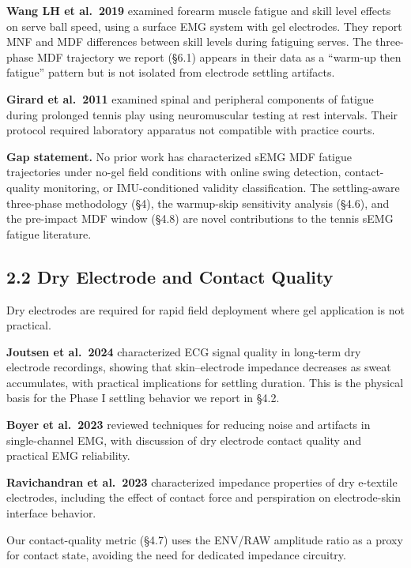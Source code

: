 \documentclass[sensors,article,submit,pdftex,moreauthors]{Definitions/mdpi}
\begin{document}
\textbf{Wang LH et al.~2019} \citep{wanglh2019} examined forearm muscle fatigue and skill level effects on serve
ball speed, using a surface EMG system with gel electrodes. They report MNF and MDF
differences between skill levels during fatiguing serves. The three-phase MDF trajectory we
report (§6.1) appears in their data as a ``warm-up then fatigue'' pattern but is not isolated
from electrode settling artifacts.

\textbf{Girard et al.~2011} \citep{girard2011} examined spinal and peripheral components of fatigue during
prolonged tennis play using neuromuscular testing at rest intervals. Their protocol required
laboratory apparatus not compatible with practice courts.

\textbf{Gap statement.} No prior work has characterized sEMG MDF fatigue trajectories under
no-gel field conditions with online swing detection, contact-quality monitoring, or
IMU-conditioned validity classification. The settling-aware three-phase methodology (§4),
the warmup-skip sensitivity analysis (§4.6), and the pre-impact MDF window (§4.8) are
novel contributions to the tennis sEMG fatigue literature.

\subsection{2.2 Dry Electrode and Contact Quality}\label{dry-electrode-and-contact-quality}

Dry electrodes are required for rapid field deployment where gel application is not practical.

\textbf{Joutsen et al.~2024} \citep{joutsen2024} characterized ECG signal quality in long-term dry electrode
recordings, showing that skin--electrode impedance decreases as sweat accumulates, with
practical implications for settling duration. This is the physical basis for the Phase I
settling behavior we report in §4.2.

\textbf{Boyer et al.~2023} \citep{boyer2023} reviewed techniques for reducing noise and artifacts in single-channel
EMG, with discussion of dry electrode contact quality and practical EMG reliability.

\textbf{Ravichandran et al.~2023} \citep{ravichandran2023} characterized impedance properties of dry e-textile electrodes,
including the effect of contact force and perspiration on electrode-skin interface behavior.

Our contact-quality metric (§4.7) uses the ENV/RAW amplitude ratio as a proxy for contact state,
avoiding the need for dedicated impedance circuitry.
\end{document}
